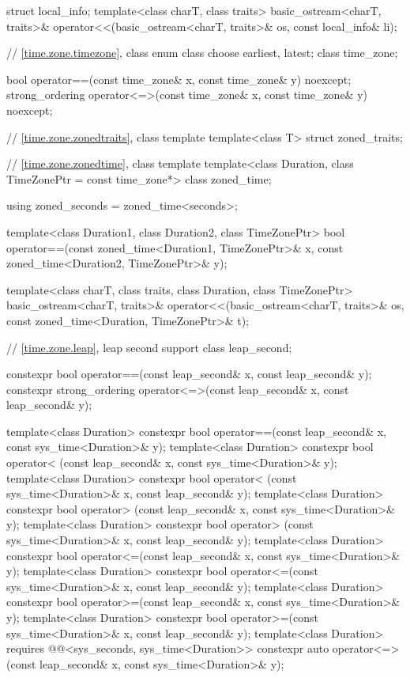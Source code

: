 \begin{codeblock}
{{    struct local_info;
    template<class charT, class traits>
      basic_ostream<charT, traits>&
        operator<<(basic_ostream<charT, traits>& os, const local_info& li);

    // \ref{time.zone.timezone}, class 
    enum class choose {earliest, latest};
    class time_zone;

    bool operator==(const time_zone& x, const time_zone& y) noexcept;
    strong_ordering operator<=>(const time_zone& x, const time_zone& y) noexcept;

    // \ref{time.zone.zonedtraits}, class template 
    template<class T> struct zoned_traits;

    // \ref{time.zone.zonedtime}, class template 
    template<class Duration, class TimeZonePtr = const time_zone*> class zoned_time;

    using zoned_seconds = zoned_time<seconds>;

    template<class Duration1, class Duration2, class TimeZonePtr>
      bool operator==(const zoned_time<Duration1, TimeZonePtr>& x,
                      const zoned_time<Duration2, TimeZonePtr>& y);

    template<class charT, class traits, class Duration, class TimeZonePtr>
      basic_ostream<charT, traits>&
        operator<<(basic_ostream<charT, traits>& os,
                   const zoned_time<Duration, TimeZonePtr>& t);

    // \ref{time.zone.leap}, leap second support
    class leap_second;

    constexpr bool operator==(const leap_second& x, const leap_second& y);
    constexpr strong_ordering operator<=>(const leap_second& x, const leap_second& y);

    template<class Duration>
      constexpr bool operator==(const leap_second& x, const sys_time<Duration>& y);
    template<class Duration>
      constexpr bool operator< (const leap_second& x, const sys_time<Duration>& y);
    template<class Duration>
      constexpr bool operator< (const sys_time<Duration>& x, const leap_second& y);
    template<class Duration>
      constexpr bool operator> (const leap_second& x, const sys_time<Duration>& y);
    template<class Duration>
      constexpr bool operator> (const sys_time<Duration>& x, const leap_second& y);
    template<class Duration>
      constexpr bool operator<=(const leap_second& x, const sys_time<Duration>& y);
    template<class Duration>
      constexpr bool operator<=(const sys_time<Duration>& x, const leap_second& y);
    template<class Duration>
      constexpr bool operator>=(const leap_second& x, const sys_time<Duration>& y);
    template<class Duration>
      constexpr bool operator>=(const sys_time<Duration>& x, const leap_second& y);
    template<class Duration>
      requires @@<sys_seconds, sys_time<Duration>>
      constexpr auto operator<=>(const leap_second& x, const sys_time<Duration>& y);

}}
\end{codeblock}
